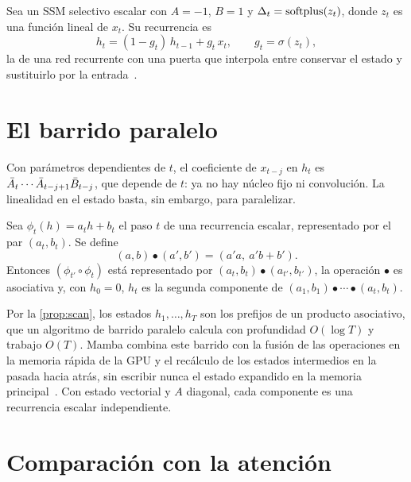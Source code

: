 \begin{teorema}\label{teo:puerta}
Sea un SSM selectivo escalar con $A=-1$, $B=1$ y $\Delta_t=\operatorname{softplus}(z_t)$, donde $z_t$ es una función lineal de $x_t$. Su recurrencia es
\[
h_t=(1-g_t)\,h_{t-1}+g_t\,x_t,\qquad g_t=\sigma(z_t),
\]
la de una red recurrente con una puerta que interpola entre conservar el estado y sustituirlo por la entrada~\cite[§3.5.1, teorema~1]{mamba}.
\end{teorema}

\addtocounter{definicion}{1}%

\section{El barrido paralelo}

Con parámetros dependientes de $t$, el coeficiente de $x_{t-j}$ en $h_t$ es $\bar{A}_t\cdots\bar{A}_{t-j+1}\bar{B}_{t-j}$, que depende de $t$: ya no hay núcleo fijo ni convolución. La linealidad en el estado basta, sin embargo, para paralelizar.

\begin{proposicion}\label{prop:scan}
Sea $\phi_t(h)=a_th+b_t$ el paso $t$ de una recurrencia escalar, representado por el par $(a_t,b_t)$. Se define
\[
(a,b)\bullet(a',b')=(a'a,\ a'b+b').
\]
Entonces $(\phi_{t'}\circ\phi_t)$ está representado por $(a_t,b_t)\bullet(a_{t'},b_{t'})$, la operación $\bullet$ es asociativa y, con $h_0=0$, $h_t$ es la segunda componente de $(a_1,b_1)\bullet\cdots\bullet(a_t,b_t)$.
\end{proposicion}

Por la \cref{prop:scan}, los estados $h_1,\dots,h_T$ son los prefijos de un producto asociativo, que un algoritmo de barrido paralelo calcula con profundidad $O(\log T)$ y trabajo $O(T)$. Mamba combina este barrido con la fusión de las operaciones en la memoria rápida de la GPU y el recálculo de los estados intermedios en la pasada hacia atrás, sin escribir nunca el estado expandido en la memoria principal~\cite[§3.3.2]{mamba}. Con estado vectorial y $A$ diagonal, cada componente es una recurrencia escalar independiente.

\section{Comparación con la atención}

